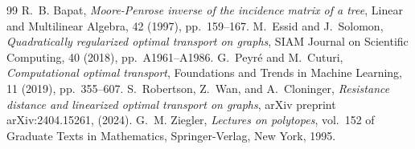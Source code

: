 \documentclass[10pt,a4paper]{amsart}
\begin{document}
\begin{thebibliography}{99}
 {\sc R.~B. Bapat}, {\em Moore-{P}enrose inverse of the incidence matrix of a tree}, Linear and Multilinear Algebra, 42 (1997), pp.~159--167.
 {\sc M.~Essid and J.~Solomon}, {\em Quadratically regularized optimal transport on graphs}, SIAM Journal on Scientific Computing, 40 (2018), pp.~A1961--A1986.
 {\sc G.~Peyr{\'e} and M.~Cuturi}, {\em Computational optimal transport}, Foundations and Trends in Machine Learning, 11 (2019), pp.~355--607.
 {\sc S.~Robertson, Z.~Wan, and A.~Cloninger}, {\em Resistance distance and linearized optimal transport on graphs}, arXiv preprint arXiv:2404.15261, (2024).
 {\sc G.~M. Ziegler}, {\em Lectures on polytopes}, vol.~152 of Graduate Texts in Mathematics, Springer-Verlag, New York, 1995.
\end{thebibliography}
\end{document}
